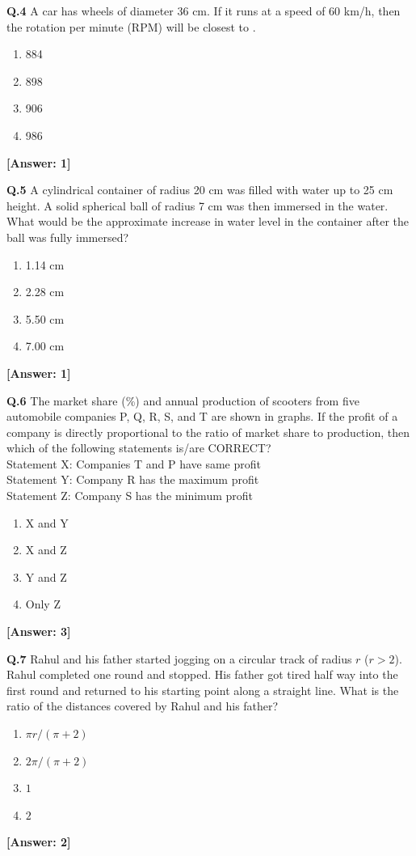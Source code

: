 \documentclass[12pt,a4paper]{article}
\newcommand{\ans}[1]{\quad\textcolor{anscolor}{\textbf{[Answer: #1]}}}
\begin{document}
\textbf{Q.4} A car has wheels of diameter 36 cm. If it runs at a speed of 60 km/h, then the rotation per minute (RPM) will be closest to \underline{\hspace{1cm}}.
\begin{enumerate}[label=\arabic*.]
\item 884 \item 898 \item 906 \item 986
\end{enumerate}\ans{1}

\textbf{Q.5} A cylindrical container of radius 20 cm was filled with water up to 25 cm height. A solid spherical ball of radius 7 cm was then immersed in the water. What would be the approximate increase in water level in the container after the ball was fully immersed?
\begin{enumerate}[label=\arabic*.]
\item 1.14 cm \item 2.28 cm \item 5.50 cm \item 7.00 cm
\end{enumerate}\ans{1}

\textbf{Q.6} The market share (\%) and annual production of scooters from five automobile companies P, Q, R, S, and T are shown in graphs. If the profit of a company is directly proportional to the ratio of market share to production, then which of the following statements is/are CORRECT?\\
Statement X: Companies T and P have same profit\\
Statement Y: Company R has the maximum profit\\
Statement Z: Company S has the minimum profit
\begin{enumerate}[label=\arabic*.]
\item X and Y \item X and Z \item Y and Z \item Only Z
\end{enumerate}\ans{3}

\textbf{Q.7} Rahul and his father started jogging on a circular track of radius $r$ ($r>2$). Rahul completed one round and stopped. His father got tired half way into the first round and returned to his starting point along a straight line. What is the ratio of the distances covered by Rahul and his father?
\begin{enumerate}[label=\arabic*.]
\item $\pi r/(\pi+2)$ \item $2\pi/(\pi+2)$ \item $1$ \item $2$
\end{enumerate}\ans{2}
\end{document}
